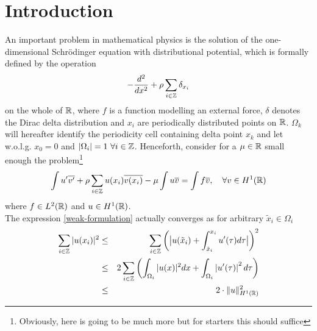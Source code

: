 \chapter{Introduction}

An important problem in mathematical physics is the solution of the one-dimensional Schrödinger equation with distributional potential, which is formally defined by the operation
\begin{equation}
	- \frac{d^{2}}{dx^{2}} + \rho \sum_{i \in \mathbb{Z}} \delta_{x_{i}} \label{the-operator}
\end{equation}
on the whole of $\mathbb{R}$, where $f$ is a function modelling an external force, $\delta$ denotes the Dirac delta distribution and $x_{i}$ are periodically distributed points on $\mathbb{R}$. $\Omega_{k}$ will hereafter identify the periodicity cell containing delta point $x_{k}$ and let w.o.l.g. $x_{0} = 0$ and $|\Omega_{i}| = 1 ~\forall i \in \mathbb{Z}$.  Henceforth, consider	for a $\mu \in \mathbb{R}$ small enough the problem\footnote{Obviously, here is going to be much more but for starters this should suffice}
\begin{equation}
	\int u' \overline{v'} + \rho \sum_{i \in \mathbb{Z}} u(x_{i}) \overline{v(x_{i})} - \mu \int u \overline{v} = \int f \overline{v}, \quad \forall v \in H^{1}(\mathbb{R}) \label{weak-formulation}
\end{equation}	
where $f \in L^{2}(\mathbb{R})$ and $u \in H^{1}(\mathbb{R})$. \\	
The expression \eqref{weak-formulation} actually converges as for arbitrary $\tilde{x}_{i} \in \Omega_{i}$
\begin{eqnarray}
	\sum_{i \in \mathbb{Z}} |u(x_{i})|^{2} & \leq & \sum_{i \in \mathbb{Z}} \left( \big| u(\tilde{x}_{i}) + \int_{\tilde{x}_{i}}^{x_{i}} u'( \tau ) d\tau \big| \right)^{2} \notag \\
		 & \leq & 2 \sum_{i \in \mathbb{Z}} \left( \int_{\Omega_{i}} |u( x )|^{2} dx +  \int_{\Omega_{i}} \left| u'(\tau) \right|^{2} d\tau \right) \notag \\
		 & \leq & 2 \cdot \| u \|^{2}_{H^{1}(\mathbb{R})} \label{eq:potentialestim}
\end{eqnarray}